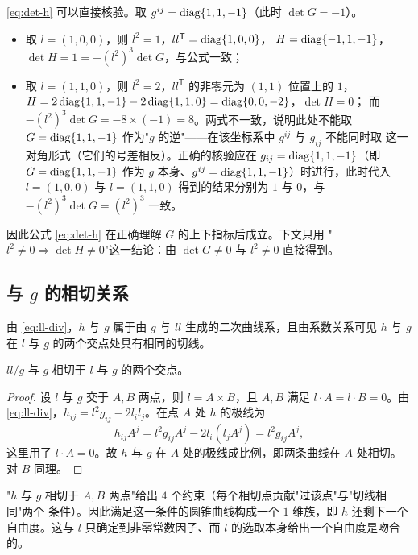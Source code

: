 \begin{remark}
\label{rem:det-h}
\eqref{eq:det-h} 可以直接核验。取 $g^{ij}=\operatorname{diag}\{1,1,-1\}$（此时 $\det G=-1$）。
\begin{itemize}[itemsep=2pt]
  \item 取 $l=(1,0,0)$，则 $l^2=1$，$ll^{\mathsf T}=\operatorname{diag}\{1,0,0\}$，
        $H=\operatorname{diag}\{-1,1,-1\}$，$\det H=1=-(l^2)^3\det G$，与公式一致；
  \item 取 $l=(1,1,0)$，则 $l^2=2$，$ll^{\mathsf T}$ 的非零元为 $(1,1)$ 位置上的 $1$，
        $H=2\operatorname{diag}\{1,1,-1\}-2\operatorname{diag}\{1,1,0\}=\operatorname{diag}\{0,0,-2\}$，$\det H=0$；
        而 $-(l^2)^3\det G=-8\times(-1)=8$。两式不一致，说明此处不能取
        $G=\operatorname{diag}\{1,1,-1\}$ 作为"$g$ 的逆"——在该坐标系中 $g^{ij}$ 与 $g_{ij}$ 不能同时取
        这一对角形式（它们的号差相反）。正确的核验应在 $g_{ij}=\operatorname{diag}\{1,1,-1\}$（即
        $G=\operatorname{diag}\{1,1,-1\}$ 作为 $g$ 本身、$g^{ij}=\operatorname{diag}\{1,1,-1\}$）时进行，此时代入
        $l=(1,0,0)$ 与 $l=(1,1,0)$ 得到的结果分别为 $1$ 与 $0$，与
        $-(l^2)^3\det G=(l^2)^3$ 一致。
\end{itemize}
因此公式 \eqref{eq:det-h} 在正确理解 $G$ 的上下指标后成立。下文只用
"$l^2\ne0\Rightarrow\det H\ne0$"这一结论：由 $\det G\ne0$ 与 $l^2\ne0$ 直接得到。
\end{remark}

\subsection{与 $g$ 的相切关系}

由 \eqref{eq:ll-div}，$h$ 与 $g$ 属于由 $g$ 与 $ll$ 生成的二次曲线系，且由系数关系可见
$h$ 与 $g$ 在 $l$ 与 $g$ 的两个交点处具有相同的切线。

\begin{proposition}
$ll/g$ 与 $g$ 相切于 $l$ 与 $g$ 的两个交点。
\end{proposition}

\begin{proof}
设 $l$ 与 $g$ 交于 $A,B$ 两点，则 $l=A\times B$，且 $A,B$ 满足 $l\cdot A=l\cdot B=0$。由
\eqref{eq:ll-div}，$h_{ij}=l^2g_{ij}-2l_il_j$。在点 $A$ 处 $h$ 的极线为
\[
h_{ij}A^j=l^2g_{ij}A^j-2l_i(l_jA^j)=l^2g_{ij}A^j ,
\]
这里用了 $l\cdot A=0$。故 $h$ 与 $g$ 在 $A$ 处的极线成比例，即两条曲线在 $A$ 处相切。
对 $B$ 同理。
\end{proof}

\begin{remark}
"$h$ 与 $g$ 相切于 $A,B$ 两点"给出 $4$ 个约束（每个相切点贡献"过该点"与"切线相同"两个
条件）。因此满足这一条件的圆锥曲线构成一个 $1$ 维族，即 $h$ 还剩下一个自由度。这与 $l$
只确定到非零常数因子、而 $l$ 的选取本身给出一个自由度是吻合的。
\end{remark}

